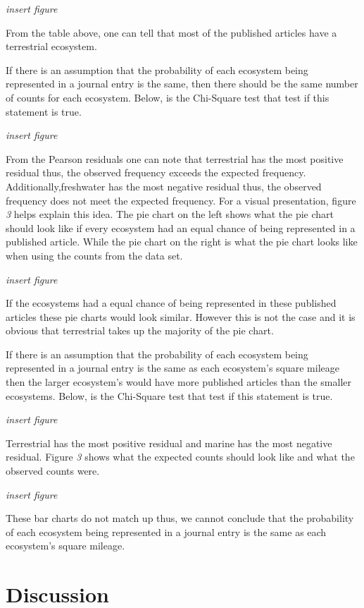 \documentclass[
]{article}
\begin{document}
\emph{insert figure}

From the table above, one can tell that most of the published articles
have a terrestrial ecosystem.

If there is an assumption that the probability of each ecosystem being
represented in a journal entry is the same, then there should be the
same number of counts for each ecosystem. Below, is the Chi-Square test
that test if this statement is true.

\emph{insert figure}

From the Pearson residuals one can note that terrestrial has the most
positive residual thus, the observed frequency exceeds the expected
frequency. Additionally,freshwater has the most negative residual thus,
the observed frequency does not meet the expected frequency. For a
visual presentation, figure \emph{3} helps explain this idea. The pie
chart on the left shows what the pie chart should look like if every
ecosystem had an equal chance of being represented in a published
article. While the pie chart on the right is what the pie chart looks
like when using the counts from the data set.

\emph{insert figure}

If the ecosystems had a equal chance of being represented in these
published articles these pie charts would look similar. However this is
not the case and it is obvious that terrestrial takes up the majority of
the pie chart.

If there is an assumption that the probability of each ecosystem being
represented in a journal entry is the same as each ecosystem's square
mileage then the larger ecosystem's would have more published articles
than the smaller ecosystems. Below, is the Chi-Square test that test if
this statement is true.

\emph{insert figure}

Terrestrial has the most positive residual and marine has the most
negative residual. Figure \emph{3} shows what the expected counts should
look like and what the observed counts were.

\emph{insert figure}

These bar charts do not match up thus, we cannot conclude that the
probability of each ecosystem being represented in a journal entry is
the same as each ecosystem's square mileage.

\hypertarget{discussion}{%
\section{Discussion}\label{discussion}}
\end{document}
